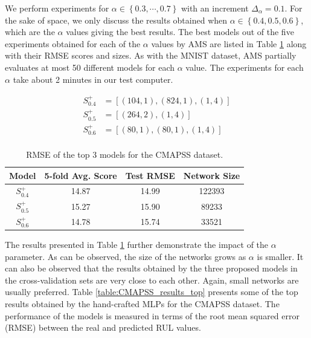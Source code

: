 \documentclass[preprint,12pt]{elsarticle}%
\begin{document}
We perform experiments for $\alpha \in \left\lbrace 0.3, \cdots, 0.7 \right\rbrace$ with an increment $\Delta_\alpha = 0.1$. For the sake of space, we only discuss the results obtained when $\alpha \in \left\lbrace 0.4, 0.5, 0.6 \right\rbrace$, which are the $\alpha$ values giving the best results. The best models out of the five experiments obtained for each of the $\alpha$ values by AMS are listed in Table \ref{table:avg_rmse_cmapss} along with their RMSE scores and sizes. As with the MNIST dataset, AMS partially evaluates at most 50 different models for each $\alpha$ value. The experiments for each $\alpha$ take about 2 minutes in our test computer.

\begin{align*}
S^+_{0.4} & = \left[ (104, 1), (824, 1), (1, 4) \right] \\
S^+_{0.5} & = \left[ (264, 2), (1, 4) \right] \\
S^+_{0.6} & = \left[ (80, 1), (80, 1), (1, 4) \right] \\
\end{align*}

\vspace{-2em}

\begin{table}[H]
\begin{center}
\begin{tabular}{| c | c | c | c |}
\hline
Model & 5-fold Avg. Score & Test RMSE & Network Size\\
\hline
$S^+_{0.4}$ & 14.87 & 14.99 & 122393\\
$S^+_{0.5}$ & 15.27 & 15.90 & 89233\\
$S^+_{0.6}$ & 14.78 & 15.74 & 33521\\
\hline
\end{tabular}
\end{center}
\caption{RMSE of the top 3 models for the CMAPSS dataset.}
\label{table:avg_rmse_cmapss}
\end{table}

The results presented in Table \ref{table:avg_rmse_cmapss} further demonstrate the impact of the $\alpha$ parameter. As can be observed, the size of the networks grows as $\alpha$ is smaller. It can also be observed that the results obtained by the three proposed models in the cross-validation sets are very close to each other. Again, small networks are usually preferred.
Table \ref{table:CMAPSS_results_top} presents some of the top results obtained by the hand-crafted MLPs for the CMAPSS dataset. The performance of the models is measured in terms of the root mean squared error (RMSE) between the real and predicted RUL values. 
\end{document}
